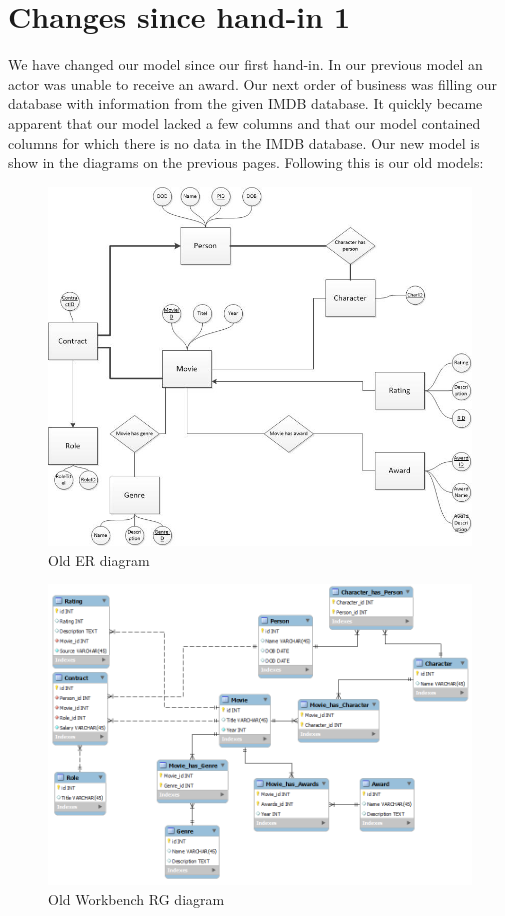 \section{Changes since hand-in 1}
We have changed our model since our first hand-in. In our previous model an actor was unable to receive an award.
Our next order of business was filling our database with information from the given IMDB database. It quickly became apparent that our model lacked a few columns and that our model contained columns for which there is no data in the IMDB database.
Our new model is show in the diagrams on the previous pages. Following this is our old models:
\begin{figure}[h!]
\includegraphics[width=\textwidth,natwidth=825,natheight=699]{illustrations/OldER.jpg}
  \caption{Old ER diagram}
\end{figure}
\begin{figure}[h!]
\includegraphics[width=\textwidth,natwidth=940,natheight=670]{illustrations/OldRG.png}
  \caption{Old Workbench RG diagram}
\end{figure}
\newpage
